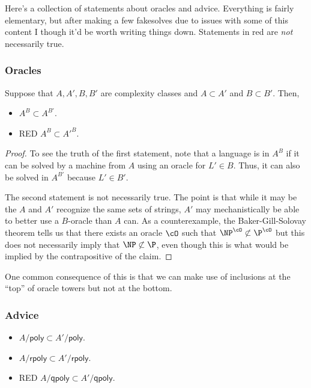 
Here's a collection of statements about oracles and advice. Everything is fairly elementary, but after making a few fakesolves due to issues with some of this content I though it'd be worth writing things down. Statements in red are \textit{not} necessarily true. 

\subsubsection{Oracles}

\begin{proposition}
    Suppose that $A, A', B, B'$ are complexity classes and $A \subset A'$ and $B \subset B'$. Then, 
    \begin{itemize}
        \item $A^B \subset A^{B'}$. 
        \item RED $A^B \subset {A'}^B$. 
    \end{itemize}
\end{proposition}

\begin{proof}
    To see the truth of the first statement, note that a language is in $A^B$ if it can be solved by a machine from $A$ using an oracle for $L' \in B$. Thus, it can also be solved in $A^{B'}$ because $L' \in B'$.


    The second statement is not necessarily true. The point is that while it may be the $A$ and $A'$ recognize the same sets of strings, $A'$ may mechanistically be able to better use a $B$-oracle than $A$ can. As a counterexample, the Baker-Gill-Solovay theorem tells us that there exists an oracle $\cO$ such that $\NP^{\cO} \not \subset \P^{\cO}$ but this does not necessarily imply that $\NP \not \subset \P$, even though this is what would be implied by the contrapositive of the claim. 
\end{proof}

One common consequence of this is that we can make use of inclusions at the ``top''  of oracle towers but not at the bottom.

\subsubsection{Advice}

\begin{proposition}
    \begin{itemize}
        \item $A/\mathsf{poly} \subset A'/\mathsf{poly}$. 
        \item $A/\mathsf{rpoly} \subset A'/\mathsf{rpoly}$.
        \item RED $A/\mathsf{qpoly} \subset A'/\mathsf{qpoly}$.
    \end{itemize}
\end{proposition}

